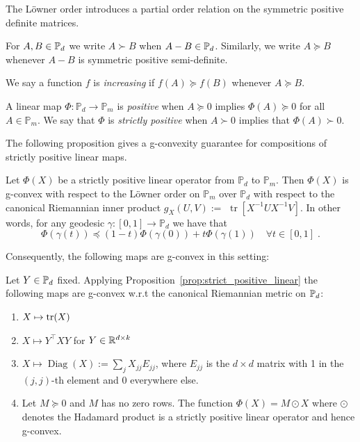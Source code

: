\documentclass[twoside,11pt]{article}
\begin{document}
The Löwner order introduces a partial order relation on the symmetric positive definite matrices.
%
\begin{definition}\label{def:loewner_order}
    For $A ,B \in \mathbb{P}_d$ we write $A \succ B$ when $A - B \in \mathbb{P}_d$. Similarly, we write $A \succeq B$ whenever $A -B$ is symmetric positive semi-definite.
\end{definition}
%
We say a function $f$ is \textit{increasing} if $f(A) \succeq f(B)$ whenever $A \succeq B$.
%
\begin{definition}
    A linear map $\Phi:\mathbb{P}_d \to \mathbb{P}_m$ is \textit{positive} when $A \succeq 0$ implies $\Phi(A) \succeq 0$ for all $A \in \mathbb{P}_m$. We say that $\Phi$ is \textit{strictly positive} when $A \succ 0$ implies that $\Phi(A) \succ 0$.
\end{definition}
%
The following proposition gives a g-convexity guarantee for compositions of strictly positive linear maps.
%
\begin{prop}\label{prop:strict_positive_linear}
    Let $\Phi(X)$ be a strictly positive linear operator from $\mathbb{P}_d$ to $\mathbb{P}_m$. Then $\Phi(X)$ is g-convex with respect to the Löwner order on $\mathbb{P}_m$ over $\mathbb{P}_d$ with respect to the canonical Riemannian inner product $g_X(U, V):=$ $\operatorname{tr}\left[X^{-1} U X^{-1} V\right]$. In other words, for any geodesic $\gamma:[0,1] \rightarrow \mathbb{P}_d$ we have that
$$
\Phi(\gamma(t)) \preceq(1-t) \Phi(\gamma(0))+t \Phi(\gamma(1)) \quad \forall t \in[0,1] \; .
$$
\end{prop}
%
Consequently, the following maps are g-convex in this setting:
%
\begin{example}
    Let $Y \in \mathbb{P}_d$ fixed. Applying Proposition~\ref{prop:strict_positive_linear} the following maps are g-convex w.r.t the canonical Riemannian metric on $\mathbb{P}_d$:
    \begin{enumerate}
    \item $X \mapsto \text{tr}(X)$ 
    \item $X \mapsto Y^\top X Y$ for $Y \in \mathbb{R}^{d \times k}$
    \item $X \mapsto \operatorname{Diag}(X) := \sum_{j}X_{jj}E_{jj}$, where $E_{jj}$ is the $d\times d$ matrix with 1 in the $(j,j)$-th element and 0 everywhere else.
    \item Let $M \succeq 0$ and $M$ has no zero rows.  The function $\Phi(X) = M \odot X$ where $\odot$ denotes the Hadamard product is a strictly positive linear operator and hence g-convex.
    \end{enumerate}
\end{example}
\end{document}
